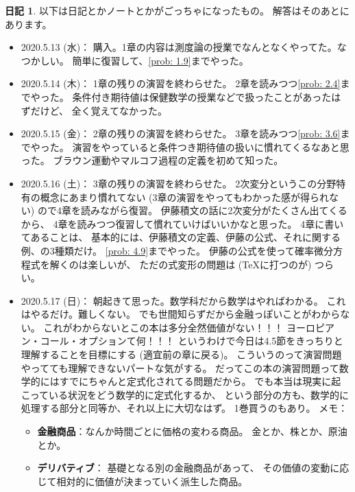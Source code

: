 \documentclass[uplatex]{jsarticle}
\theoremstyle{definition}
\newtheorem*{nikki*}{日記}
\begin{document}
\begin{nikki*}
  以下は日記とかノートとかがごっちゃになったもの。
  解答はそのあとにあります。
  \begin{itemize}
    \item
    2020.5.13 (水)：
    購入。1章の内容は測度論の授業でなんとなくやってた。なつかしい。
    簡単に復習して、\autoref{prob: 1.9}までやった。
    \item
    2020.5.14 (木)：
    1章の残りの演習を終わらせた。
    2章を読みつつ\autoref{prob: 2.4}までやった。
    条件付き期待値は保健数学の授業などで扱ったことがあったはずだけど、
    全く覚えてなかった。
    \item
    2020.5.15 (金)：
    2章の残りの演習を終わらせた。
    3章を読みつつ\autoref{prob: 3.6}までやった。
    演習をやっていると条件つき期待値の扱いに慣れてくるなあと思った。
    ブラウン運動やマルコフ過程の定義を初めて知った。
    \item
    2020.5.16 (土)：
    3章の残りの演習を終わらせた。
    2次変分というこの分野特有の概念にあまり慣れてない
    (3章の演習をやってもわかった感が得られない)
    ので4章を読みながら復習。
    伊藤積文の話に2次変分がたくさん出てくるから、
    4章を読みつつ復習して慣れていけばいいかなと思った。
    4章に書いてあることは、
    基本的には、伊藤積文の定義、伊藤の公式、それに関する例、の3種類だけ。
    \autoref{prob: 4.9}までやった。
    伊藤の公式を使って確率微分方程式を解くのは楽しいが、
    ただの式変形の問題は (\TeX に打つのが) つらい。
    \item
    2020.5.17 (日)：
    朝起きて思った。数学科だから数学はやればわかる。
    これはやるだけ。難しくない。
    でも世間知らずだから金融っぽいことがわからない。
    これがわからないとこの本は多分全然価値がない！！！
    ヨーロピアン・コール・オプションて何！！！
    というわけで今日は4.5節をきっちりと理解することを目標にする
    (適宜前の章に戻る)。
    こういうのって演習問題やってても理解できないパートな気がする。
    だってこの本の演習問題って数学的にはすでにちゃんと定式化されてる問題だから。
    でも本当は現実に起こっている状況をどう数学的に定式化するか、
    という部分の方も、数学的に処理する部分と同等か、それ以上に大切なはず。
    1巻買うのもあり。
    メモ：
    \begin{itemize}
      \item
      \textbf{金融商品}：なんか時間ごとに価格の変わる商品。
      金とか、株とか、原油とか。
      \item
      \textbf{デリバティブ}：
      基礎となる別の金融商品があって、
      その価値の変動に応じて相対的に価値が決まっていく派生した商品。

\end{itemize}
\end{itemize}
\end{nikki*}
\end{document}
